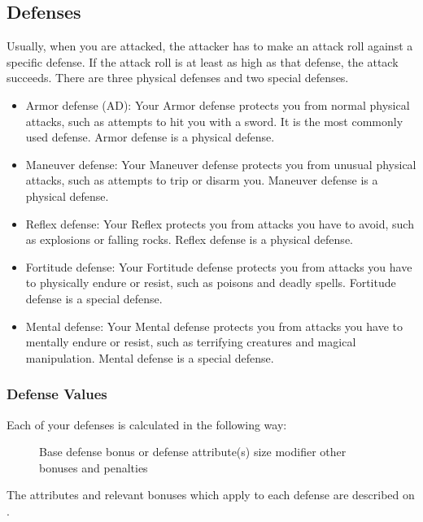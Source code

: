 \subsection{Defenses}\label{Defenses}
Usually, when you are attacked, the attacker has to make an attack roll against a specific defense.
If the attack roll is at least as high as that defense, the attack succeeds.
There are three physical defenses and two special defenses.
\begin{itemize}
    \item Armor defense (AD): Your Armor defense protects you from normal physical attacks, such as attempts to hit you with a sword.
        It is the most commonly used defense.
        Armor defense is a physical defense.
    \item Maneuver defense: Your Maneuver defense protects you from unusual physical attacks, such as attempts to trip or disarm you.
        Maneuver defense is a physical defense.
    \item Reflex defense: Your Reflex protects you from attacks you have to avoid, such as explosions or falling rocks.
        Reflex defense is a physical defense.
    \item Fortitude defense: Your Fortitude defense protects you from attacks you have to physically endure or resist, such as poisons and deadly spells.
        Fortitude defense is a special defense.
    \item Mental defense: Your Mental defense protects you from attacks you have to mentally endure or resist, such as terrifying creatures and magical manipulation.
        Mental defense is a special defense.
\end{itemize}

\subsubsection{Defense Values}

Each of your defenses is calculated in the following way:

\begin{figure}[h]
     \add Base defense bonus or defense attribute(s) \add size modifier \add other bonuses and penalties
\end{figure}

The attributes and relevant bonuses which apply to each defense are described on .

